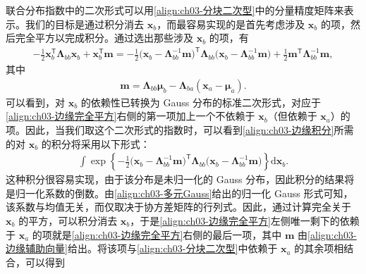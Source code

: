 \documentclass[../../main.tex]{subfiles}
\begin{document}
联合分布指数中的二次形式可以用\eqref{align:ch03-分块二次型}中的分量精度矩阵来表示。我们的目标是通过积分消去 $\boldsymbol{x}_{b}$，而最容易实现的是首先考虑涉及 $\boldsymbol{x}_{b}$ 的项，然后完全平方以完成积分。通过选出那些涉及 $\boldsymbol{x}_{b}$ 的项，有
\begin{align}
-\frac{1}{2}\boldsymbol{x}_{b}^{\mathsf{T}}\boldsymbol{\Lambda}_{bb}\boldsymbol{x}_{b}+\boldsymbol{x}_{b}^{\mathsf{T}}\boldsymbol{m}=-\frac{1}{2}\bigl(\boldsymbol{x}_{b}-\boldsymbol{\Lambda}_{bb}^{-1}\boldsymbol{m}\bigr)^{\mathsf{T}}\boldsymbol{\Lambda}_{bb}\bigl(\boldsymbol{x}_{b}-\boldsymbol{\Lambda}_{bb}^{-1}\boldsymbol{m}\bigr)+\frac{1}{2}\boldsymbol{m}^{\mathsf{T}}\boldsymbol{\Lambda}_{bb}^{-1}\boldsymbol{m},
\label{align:ch03-边缘完全平方}
\end{align}
其中
\begin{align}
\boldsymbol{m}=\boldsymbol{\Lambda}_{bb}\boldsymbol{\mu}_{b}-\boldsymbol{\Lambda}_{ba}(\boldsymbol{x}_{a}-\boldsymbol{\mu}_{a}).
\label{align:ch03-边缘辅助向量}
\end{align}
可以看到，对 $\boldsymbol{x}_{b}$ 的依赖性已转换为 Gauss 分布的标准二次形式，对应于\eqref{align:ch03-边缘完全平方}右侧的第一项加上一个不依赖于 $\boldsymbol{x}_{b}$（但依赖于 $\boldsymbol{x}_{a}$）的项。因此，当我们取这个二次形式的指数时，可以看到\eqref{align:ch03-边缘积分}所需的对 $\boldsymbol{x}_{b}$ 的积分将采用以下形式：
\begin{align}
\int\exp\left\{-\frac{1}{2}\bigl(\boldsymbol{x}_{b}-\boldsymbol{\Lambda}_{bb}^{-1}\boldsymbol{m}\bigr)^{\mathsf{T}}\boldsymbol{\Lambda}_{bb}\bigl(\boldsymbol{x}_{b}-\boldsymbol{\Lambda}_{bb}^{-1}\boldsymbol{m}\bigr)\right\}\mathrm{d}\boldsymbol{x}_{b}.
\label{align:ch03-边缘积分消去}
\end{align}
这种积分很容易实现，由于该分布是未归一化的 Gauss 分布，因此积分的结果将是归一化系数的倒数。由\eqref{align:ch03-多元Gauss}给出的归一化 Gauss 形式可知，该系数与均值无关，而仅取决于协方差矩阵的行列式。因此，通过计算完全关于 $\boldsymbol{x}_{b}$ 的平方，可以积分消去 $\boldsymbol{x}_{b}$，于是\eqref{align:ch03-边缘完全平方}左侧唯一剩下的依赖于 $\boldsymbol{x}_{a}$ 的项就是\eqref{align:ch03-边缘完全平方}右侧的最后一项，其中 $\boldsymbol{m}$ 由\eqref{align:ch03-边缘辅助向量}给出。将该项与\eqref{align:ch03-分块二次型}中依赖于 $\boldsymbol{x}_{a}$ 的其余项相结合，可以得到
\end{document}
